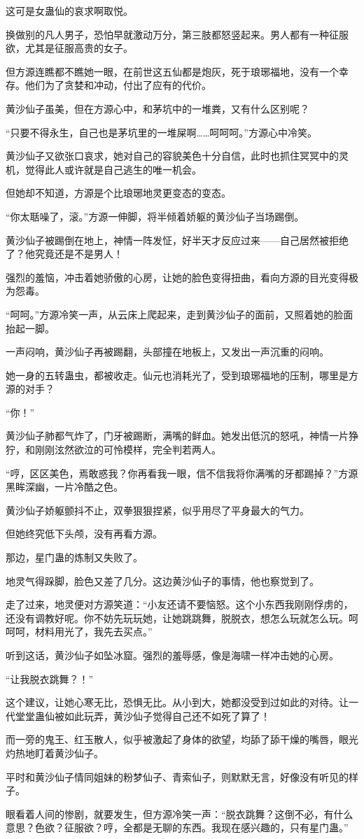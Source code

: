 \begin{this_body}
这可是女蛊仙的哀求啊取悦。

换做别的凡人男子，恐怕早就激动万分，第三肢都怒竖起来。男人都有一种征服欲，尤其是征服高贵的女子。

但方源连瞧都不瞧她一眼，在前世这五仙都是炮灰，死于琅琊福地，没有一个幸存。他们为了贪婪和冲动，付出了应有的代价。

黄沙仙子虽美，但在方源心中，和茅坑中的一堆粪，又有什么区别呢？

“只要不得永生，自己也是茅坑里的一堆屎啊……呵呵呵。”方源心中冷笑。

黄沙仙子又欲张口哀求，她对自己的容貌美色十分自信，此时也抓住冥冥中的灵机，觉得此人或许就是自己逃生的唯一机会。

但她却不知道，方源是个比琅琊地灵更变态的变态。

“你太聒噪了，滚。”方源一伸脚，将半倾着娇躯的黄沙仙子当场踢倒。

黄沙仙子被踢倒在地上，神情一阵发怔，好半天才反应过来——自己居然被拒绝了？他究竟还是不是男人！

强烈的羞恼，冲击着她骄傲的心房，让她的脸色变得扭曲，看向方源的目光变得极为怨毒。

“呵呵。”方源冷笑一声，从云床上爬起来，走到黄沙仙子的面前，又照着她的脸面抬起一脚。

一声闷响，黄沙仙子再被踢翻，头部撞在地板上，又发出一声沉重的闷响。

她一身的五转蛊虫，都被收走。仙元也消耗光了，受到琅琊福地的压制，哪里是方源的对手？

“你！”

黄沙仙子肺都气炸了，门牙被踢断，满嘴的鲜血。她发出低沉的怒吼，神情一片狰狞，和刚刚泫然欲泣的可怜模样，完全判若两人。

“哼，区区美色，焉敢惑我？你再看我一眼，信不信我将你满嘴的牙都踢掉？”方源黑眸深幽，一片冷酷之色。

黄沙仙子娇躯颤抖不止，双拳狠狠捏紧，似乎用尽了平身最大的气力。

但她终究低下头颅，没有再看方源。

那边，星门蛊的炼制又失败了。

地灵气得跺脚，脸色又差了几分。这边黄沙仙子的事情，他也察觉到了。

走了过来，地灵便对方源笑道：“小友还请不要恼怒。这个小东西我刚刚俘虏的，还没有调教好呢。你不妨先玩玩她，让她跳跳舞，脱脱衣，想怎么玩就怎么玩。呵呵呵，材料用光了，我先去买点。”

听到这话，黄沙仙子如坠冰窟。强烈的羞辱感，像是海啸一样冲击她的心房。

“让我脱衣跳舞？！”

这个建议，让她心寒无比，恐惧无比。从小到大，她都没受到过如此的对待。让一代堂堂蛊仙被如此玩弄，黄沙仙子觉得自己还不如死了算了！

而一旁的鬼王、红玉散人，似乎被激起了身体的欲望，均舔了舔干燥的嘴唇，眼光灼热地盯着黄沙仙子。

平时和黄沙仙子情同姐妹的粉梦仙子、青索仙子，则默默无言，好像没有听见的样子。

眼看着人间的惨剧，就要发生，但方源冷笑一声：“脱衣跳舞？这倒不必，有什么意思？色欲？征服欲？哼，全都是无聊的东西。我现在感兴趣的，只有星门蛊。”

\end{this_body}


